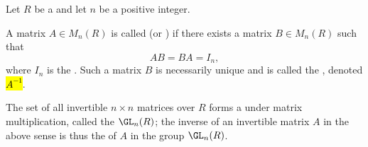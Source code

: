 \begin{definition} \label{definition:invertible_matrix_over_a_ring}
    Let $R$ be a  and let $n$ be a positive integer.

    A matrix $A \in M_n(R)$ is called  (or ) if there exists a matrix $B \in M_n(R)$ such that
    $$AB = BA = I_n,$$
    where $I_n$ is the . Such a matrix $B$ is necessarily unique and is called the , denoted \hl{$A^{-1}$}.

    The set of all invertible $n \times n$ matrices over $R$ forms a  under matrix multiplication, called the  $\GL_n(R)$; the inverse of an invertible matrix $A$ in the above sense is thus the  of $A$ in the group $\GL_n(R)$.
\end{definition}